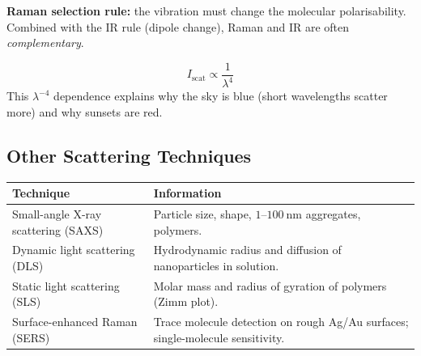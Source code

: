 \documentclass[12pt,a4paper]{article}
\begin{document}
\begin{tcolorbox}[tikzbox, title={Rayleigh, Stokes and Anti-Stokes Lines in Raman}]
\centering
{}
\end{tcolorbox}

\textbf{Raman selection rule:} the vibration must change the molecular polarisability. Combined with the IR rule (dipole change), Raman and IR are often \emph{complementary}.

\begin{tcolorbox}[formulabox, title={Rayleigh Intensity Dependence}]
\[
I_{\mathrm{scat}}\propto \frac{1}{\lambda^{4}}
\]
This $\lambda^{-4}$ dependence explains why the sky is blue (short wavelengths scatter more) and why sunsets are red.
\end{tcolorbox}

\subsection{Other Scattering Techniques}
\begin{tabularx}{\linewidth}{|B{3.0cm}|Y|}
\hline
\textbf{Technique} & \textbf{Information} \\
\hline
Small-angle X-ray scattering (SAXS) & Particle size, shape, $1$--$100\ \mathrm{nm}$ aggregates, polymers. \\
\hline
Dynamic light scattering (DLS) & Hydrodynamic radius and diffusion of nanoparticles in solution. \\
\hline
Static light scattering (SLS) & Molar mass and radius of gyration of polymers (Zimm plot). \\
\hline
Surface-enhanced Raman (SERS) & Trace molecule detection on rough Ag/Au surfaces; single-molecule sensitivity. \\
\hline
\end{tabularx}
\end{document}
